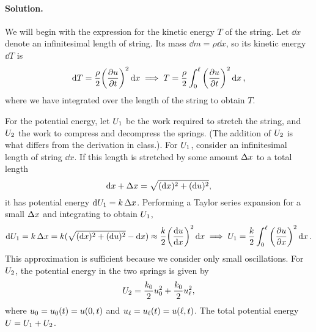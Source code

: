 \documentclass[11pt]{article}
\newenvironment{solution}
{
    \paragraph{Solution.}
    \ignorespaces
}
{
}
\begin{document}
\begin{solution}
	We will begin with the expression for the kinetic energy $T$ of the string.  Let $\dd{x}$ denote an infinitesimal length of string.  Its mass $\dd{m} = \rho \dd{x}$, so its kinetic energy $\dd{T}$ is
\begin{equation} \label{T}
	\dd{T} = \frac{\rho}{2} \bigg( \pdv{u}{t} \bigg)^2 \dd{x} \implies T = \frac{\rho}{2} \int_0^\ell \bigg( \pdv{u}{t} \bigg)^2 \dd{x},
\end{equation}
	where we have integrated over the length of the string to obtain $T$.
	
	For the potential energy, let $U_1$ be the work required to stretch the string, and $U_2$ the work to compress and decompress the springs.  (The addition of $U_2$ is what differs from the derivation in class.).  For $U_1$, consider an infinitesimal length of string $\dd{x}$.  If this length is stretched by some amount $\Delta x$ to a total length
	\begin{equation}
		\dd{x} + \Delta x = \sqrt{(\dd{x})^2 + (\dd{u})^2},
	\end{equation}
	it has potential energy $\dd{U_1} = k \,\Delta x$.  Performing a Taylor series expansion for a small $\Delta x$ and integrating to obtain $U_1$,
	\begin{equation} \label{U1}
		\dd{U_1} = k \,\Delta x = k (\sqrt{(\dd{x})^2 + (\dd{u})^2} - \dd{x}) \approx \frac{k}{2} \bigg( \dv{u}{x} \bigg)^2 \dd{x} \implies U_1 = \frac{k}{2} \int_0^\ell \bigg( \pdv{u}{x} \bigg)^2 \dd{x}.
	\end{equation}
	This approximation is sufficient because we consider only small oscillations.  For $U_2$, the potential energy in the two springs is given by
	\begin{equation} \label{U2}
		U_2 = \frac{k_0}{2} u_0^2 + \frac{k_0}{2} u_\ell^2,
	\end{equation}
	where $u_0 = u_0(t) = u(0, t)$ and $u_\ell = u_\ell(t) = u(\ell, t)$.  The total potential energy $U = U_1 + U_2$.
	

\end{solution}
\end{document}

